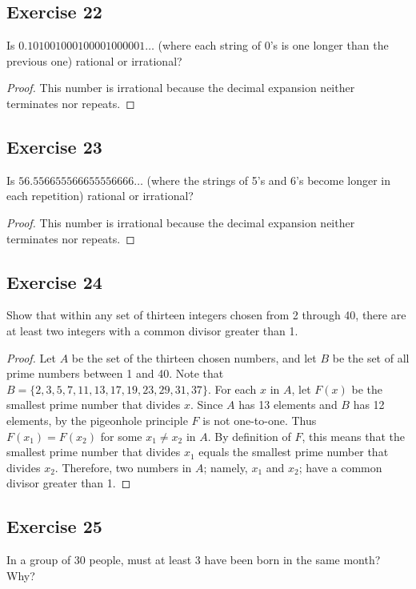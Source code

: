 \documentclass[14pt]{extarticle}
\begin{document}
\subsection{Exercise 22}
Is \(0.101001000100001000001 \ldots\) (where each string of 0’s is one longer than the previous one) rational or 
irrational?

\begin{proof}
This number is irrational because the decimal expansion neither terminates nor repeats.
\end{proof}

\subsection{Exercise 23}
Is \(56.556655566655556666 \ldots\)  (where the strings of 5’s and 6’s become longer in each repetition) rational or 
irrational?

\begin{proof}
This number is irrational because the decimal expansion neither terminates nor repeats.
\end{proof}

\subsection{Exercise 24}
Show that within any set of thirteen integers chosen from 2 through 40, there are at least two integers with a common 
divisor greater than 1.

\begin{proof}
Let \(A\) be the set of the thirteen chosen numbers, and let \(B\) be the set of all prime numbers between 1 and 40. 
Note that \(B = \{2, 3, 5, 7, 11, 13, 17, 19, 23, 29, 31, 37\}\). For each \(x\) in \(A\), let \(F(x)\) be the 
smallest prime number that divides \(x\). Since \(A\) has 13 elements and \(B\) has 12 elements, by the pigeonhole 
principle \(F\) is not one-to-one. Thus \(F(x_1) = F(x_2)\) for some \(x_1 \neq x_2\) in \(A\). By definition of \(F\), 
this means that the smallest prime number that divides \(x_1\) equals the smallest prime number that divides 
\(x_2\). Therefore, two numbers in \(A\); namely, \(x_1\) and \(x_2\); have a common divisor greater than 1. 
\end{proof}

\subsection{Exercise 25}
In a group of 30 people, must at least 3 have been born in the same month? Why?
\end{document}
